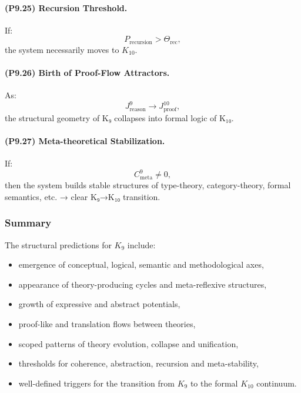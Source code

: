 \paragraph{(P9.25) Recursion Threshold.}
If:
\[
P_{\mathrm{recursion}} > \Theta_{\mathrm{rec}},
\]
the system necessarily moves to $K_{10}$.

\paragraph{(P9.26) Birth of Proof-Flow Attractors.}
As:
\[
J_{\mathrm{reason}}^9
\to
J_{\mathrm{proof}}^{10},
\]
the structural geometry of K₉ collapses into formal logic of K₁₀.

\paragraph{(P9.27) Meta-theoretical Stabilization.}
If:
\[
C_{\mathrm{meta}}^9 \neq 0,
\]
then the system builds stable structures of type-theory, category-theory, formal semantics, etc. → clear K₉→K₁₀ transition.

\subsubsection{Summary}

The structural predictions for $K_9$ include:
\begin{itemize}
    \item emergence of conceptual, logical, semantic and methodological axes,
    \item appearance of theory-producing cycles and meta-reflexive structures,
    \item growth of expressive and abstract potentials,
    \item proof-like and translation flows between theories,
    \item scoped patterns of theory evolution, collapse and unification,
    \item thresholds for coherence, abstraction, recursion and meta-stability,
    \item well-defined triggers for the transition from $K_9$ to the formal $K_{10}$ continuum.
\end{itemize}
